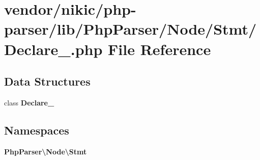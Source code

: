 \section{vendor/nikic/php-\/parser/lib/\+Php\+Parser/\+Node/\+Stmt/\+Declare\+\_\+.php File Reference}
\label{_declare___8php}
\subsection*{Data Structures}
\begin{DoxyCompactItemize}
\item 
class {\bf Declare\+\_\+}
\end{DoxyCompactItemize}
\subsection*{Namespaces}
\begin{DoxyCompactItemize}
\item 
 {\bf Php\+Parser\textbackslash{}\+Node\textbackslash{}\+Stmt}
\end{DoxyCompactItemize}
